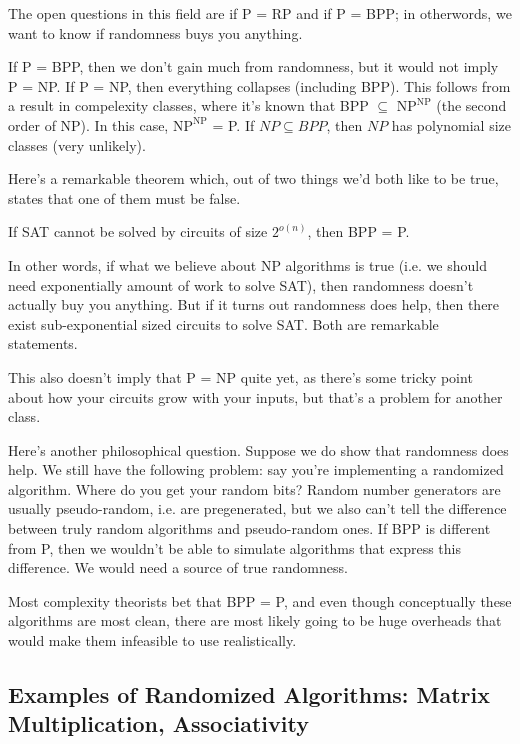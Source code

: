 \documentclass[11 pt]{scrartcl}
\begin{document}
The open questions in this field are if P = RP and if P = BPP; in otherwords, we want to know if randomness buys you anything. 

\begin{itemize}
    \ii If P = BPP, then we don't gain much from randomness, but it would not imply P = NP. 
    \ii If P = NP, then everything collapses (including BPP). This follows from a result in compelexity classes, where it's known that BPP $\subseteq$ $\text{NP}^{\text{NP}}$ (the second order of NP). In this case, $\text{NP}^{\text{NP}}$ = P.  
    \ii If $NP \subseteq BPP$, then $NP$ has polynomial size classes (very unlikely). 
\end{itemize}

Here's a remarkable theorem which, out of two things we'd both like to be true, states that one of them must be false. 
\begin{theorem}
    If SAT cannot be solved by circuits of size $2^{o(n)}$, then BPP = P. 
\end{theorem}
In other words, if what we believe about NP algorithms is true (i.e. we should need exponentially amount of work to solve SAT), then randomness doesn't actually buy you anything. But if it turns out randomness does help, then there exist sub-exponential sized circuits to solve SAT. Both are remarkable statements. 

This also doesn't imply that P = NP quite yet, as there's some tricky point about how your circuits grow with your inputs, but that's a problem for another class. 

Here's another philosophical question. Suppose we do show that randomness does help. We still have the following problem: say you're implementing a randomized algorithm. Where do you get your random bits? Random number generators are usually pseudo-random, i.e. are pregenerated, but we also can't tell the difference between truly random algorithms and pseudo-random ones. If BPP is different from P, then we wouldn't be able to simulate algorithms that express this difference. We would need a source of true randomness. 


Most complexity theorists bet that BPP = P, and even though conceptually these algorithms are most clean, there are most likely going to be huge overheads that would make them infeasible to use realistically. 

\subsection{Examples of Randomized Algorithms: Matrix Multiplication, Associativity}
\end{document}
